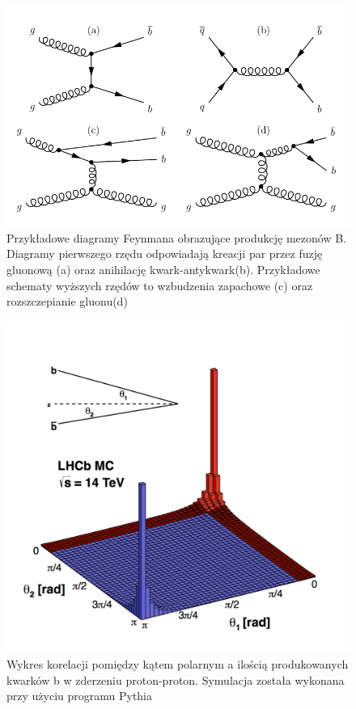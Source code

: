 \begin{figure}[h]
  \centering
  \includegraphics[scale=0.5]{rozdzial2/Feynman.png}
  \caption{Przykładowe diagramy Feynmana obrazujące produkcję mezonów B. Diagramy pierwszego rzędu odpowiadają kreacji par przez fuzję gluonową (a) oraz anihilację kwark-antykwark(b). Przykładowe schematy wyższych rzędów to wzbudzenia zapachowe (c) oraz rozszczepianie gluonu(d)}
  \label{fig:feynman}
\end{figure}



\begin{figure}[h]
  \centering
  \includegraphics[scale=0.7]{rozdzial2/pythia.jpg}
  \caption{Wykres korelacji pomiędzy kątem polarnym a ilością produkowanych kwarków b w zderzeniu proton-proton. Symulacja została wykonana przy użyciu programu Pythia \cite{PYTHIA}}
  \label{fig:pythia}
\end{figure}

